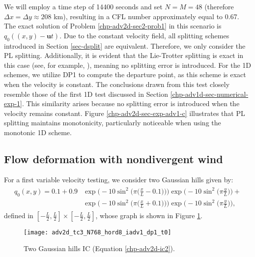 We will employ a time step of 14400 seconds and set $N=M=48$ (therefore $\Delta x = \Delta y \approx 208$ km), resulting in a CFL number approximately equal to 0.67.
The exact solution of Problem \ref{chp-adv2d-sec2-prob1} in this scenario is $q_0((x,y)-\boldsymbol{u}t)$.
Due to the constant velocity field, all splitting schemes introduced in Section \ref{sec-dsplit} are equivalent.
Therefore, we only consider the PL splitting. Additionally, it is evident that the Lie-Trotter splitting is exact in this case 
(see, for example, \cite[p.~202-203]{leveque:1990}), meaning no splitting error is introduced.
For the 1D schemes, we utilize DP1 to compute the departure point, as this scheme is exact when the velocity is constant.
The conclusions drawn from this test closely resemble those of the first 1D test discussed in Section \ref{chp-adv1d-sec-numerical-exp-1}.
This similarity arises because no splitting error is introduced when the velocity remains constant.
Figure \ref{chp-adv2d-sec-exp-adv1-c} illustrates that PL splitting maintains monotonicity, particularly noticeable when using the monotonic 1D scheme.

\subsection{Flow deformation with nondivergent wind}
\label{2d-adv-ndivflow}
For a first variable velocity testing, we consider two Gaussian hills given by:
\begin{align}
	\begin{split}
	\label{chp-adv2d-ic2}
	q_0(x,y) = 0.1 + 0.9&\exp\bigg(-10\sin^2 \bigg(\pi \bigg(\frac{x}{L}-0.1\bigg)\bigg)\bigg) \exp\bigg(-10\sin^2 \bigg(\pi \frac{y}{L}\bigg) \bigg)+ \\
	           &\exp\bigg(-10\sin^2 \bigg(\pi \bigg(\frac{x}{L}+0.1\bigg)\bigg)\bigg) \exp\bigg(-10\sin^2 \bigg(\pi \frac{y}{L}\bigg) \bigg),
	\end{split}
\end{align}
defined in $[-\frac{L}{2},\frac{L}{2}] \times [-\frac{L}{2},\frac{L}{2}]$, whose graph is shown in Figure \ref{chp-adv2d-sec-exp-adv2-ic}.
\begin{figure}[!htb]
	\centering
	\texttt{[image: adv2d\_tc3\_N768\_hord8\_iadv1\_dp1\_t0]}
	\caption{Two Gaussian hills IC (Equation \eqref{chp-adv2d-ic2}). \label{chp-adv2d-sec-exp-adv2-ic}}
\end{figure}

